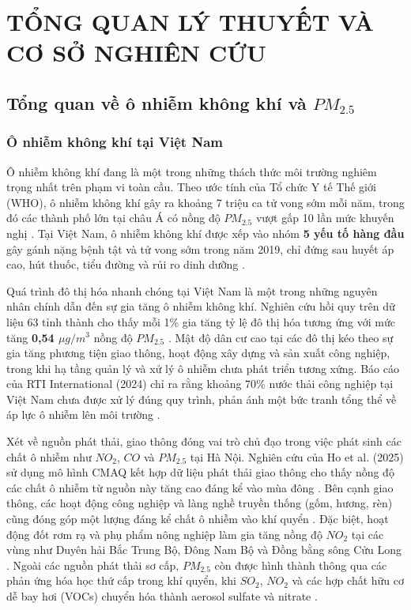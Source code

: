 \chapter{TỔNG QUAN LÝ THUYẾT VÀ CƠ SỞ NGHIÊN CỨU}
\section{ Tổng quan về ô nhiễm không khí và $PM_{2.5}$}
\subsection{Ô nhiễm không khí tại Việt Nam}
Ô nhiễm không khí đang là một trong những thách thức môi trường nghiêm trọng nhất trên phạm vi toàn cầu. Theo ước tính của Tổ chức Y tế Thế giới (WHO), ô nhiễm không khí gây ra khoảng 7 triệu ca tử vong sớm mỗi năm, trong đó các thành phố lớn tại châu Á có nồng độ $PM_{2.5}$ vượt gấp 10 lần mức khuyến nghị \cite{krzyzanowski2014megacities}. Tại Việt Nam, ô nhiễm không khí được xếp vào nhóm \textbf{5 yếu tố hàng đầu} gây gánh nặng bệnh tật và tử vong sớm trong năm 2019, chỉ đứng sau huyết áp cao, hút thuốc, tiểu đường và rủi ro dinh dưỡng \cite{hoang2023health}.

Quá trình đô thị hóa nhanh chóng tại Việt Nam là một trong những nguyên nhân chính dẫn đến sự gia tăng ô nhiễm không khí. Nghiên cứu hồi quy trên dữ liệu 63 tỉnh thành cho thấy mỗi 1\% gia tăng tỷ lệ đô thị hóa tương ứng với mức tăng \textbf{0,54 $\mu g/m^3$} nồng độ $PM_{2.5}$ \cite{bui2025urbanization}. Mật độ dân cư cao tại các đô thị kéo theo sự gia tăng phương tiện giao thông, hoạt động xây dựng và sản xuất công nghiệp, trong khi hạ tầng quản lý và xử lý ô nhiễm chưa phát triển tương xứng. Báo cáo của RTI International (2024) chỉ ra rằng khoảng 70\% nước thải công nghiệp tại Việt Nam chưa được xử lý đúng quy trình, phản ánh một bức tranh tổng thể về áp lực ô nhiễm lên môi trường \cite{rti2024pollution}.

Xét về nguồn phát thải, giao thông đóng vai trò chủ đạo trong việc phát sinh các chất ô nhiễm như $NO_2$, $CO$ và $PM_{2.5}$ tại Hà Nội. Nghiên cứu của Ho et al. (2025) sử dụng mô hình CMAQ kết hợp dữ liệu phát thải giao thông cho thấy nồng độ các chất ô nhiễm từ nguồn này tăng cao đáng kể vào mùa đông \cite{ho2025assessment}. Bên cạnh giao thông, các hoạt động công nghiệp và làng nghề truyền thống (gốm, hương, rèn) cũng đóng góp một lượng đáng kể chất ô nhiễm vào khí quyển \cite{hoang2023health}. Đặc biệt, hoạt động đốt rơm rạ và phụ phẩm nông nghiệp làm gia tăng nồng độ $NO_2$ tại các vùng như Duyên hải Bắc Trung Bộ, Đông Nam Bộ và Đồng bằng sông Cửu Long \cite{hoang2023health}. Ngoài các nguồn phát thải sơ cấp, $PM_{2.5}$ còn được hình thành thông qua các phản ứng hóa học thứ cấp trong khí quyển, khi $SO_2$, $NO_2$ và các hợp chất hữu cơ dễ bay hơi (VOCs) chuyển hóa thành aerosol sulfate và nitrate \cite{le2024environmental}.


